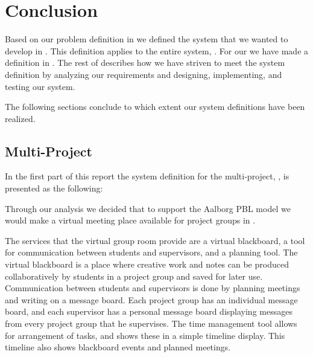 \chapter{Conclusion}
\label{chap:conclusion}

Based on our problem definition in  we defined the system that we wanted to develop in .
This definition applies to the entire system, \system{}.
For our \subsystem{} we have made a definition in . 
The rest of  describes how we have striven to meet the system definition by analyzing our requirements and designing,  implementing, and testing our system.

The following sections conclude to which extent our system definitions have been realized.

\section{Multi-Project}
\label{sec:multiconclusion}
In the first part of this report the system definition for the multi-project, \system{}, is presented as the following: 



Through our analysis we decided that to support the Aalborg PBL model we would make a virtual meeting place available for project groups in \moodle{}.

The services that the virtual group room provide are a virtual blackboard, a tool for communication between students and supervisors, and a planning tool.
The virtual blackboard is a place where creative work and notes can be produced collaboratively by students in a project group and saved for later use.
Communication between students and supervisors is done by planning meetings and writing on a message board.
Each project group has an individual message board, and each supervisor has a personal message board displaying messages from every project group that he supervises.
The time management tool allows for arrangement of tasks, and shows these in a simple timeline display.
This timeline also shows blackboard events and planned meetings.

